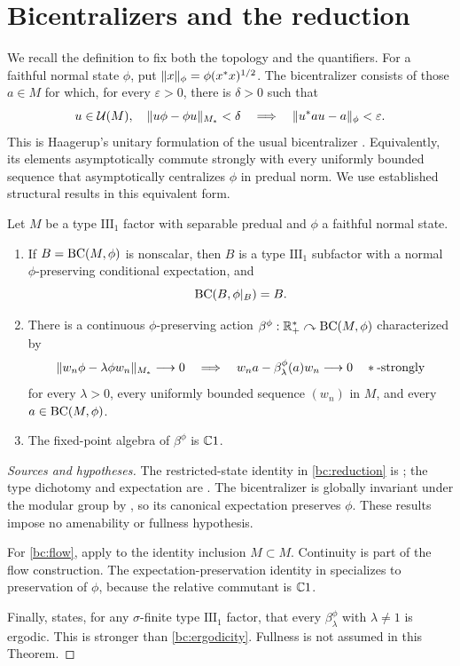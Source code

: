 \section{Bicentralizers and the reduction}\label{sec:bicentralizers}

We recall the definition to fix both the topology and the quantifiers.
For a faithful normal state $\phi$, put
$\lVert x\rVert_\phi=\phi(x^*x)^{1/2}$.
The bicentralizer consists of those $a\in M$ for which, for every
$\varepsilon>0$, there is $\delta>0$ such that
\[
  u\in\mathcal U(M),\quad
  \lVert u\phi-\phi u\rVert_{M_*}<\delta
  \quad\Longrightarrow\quad
  \lVert u^*au-a\rVert_\phi<\varepsilon.
\]
This is Haagerup's unitary formulation of the usual bicentralizer
\cite[proof of Lemma~1.2]{Haagerup1987}.
Equivalently, its elements asymptotically commute strongly with every
uniformly bounded sequence that asymptotically centralizes $\phi$ in
predual norm. We use established structural results in this equivalent
form.

\begin{proposition}\label{bc:inputs}
Let $M$ be a type $\mathrm{III}_1$ factor with separable predual and
$\phi$ a faithful normal state.
\begin{enumerate}
\item\label{bc:reduction}
If $B=\operatorname{BC}(M,\phi)$ is nonscalar, then $B$ is a type
$\mathrm{III}_1$ subfactor with a normal $\phi$-preserving conditional
expectation, and
\[
  \operatorname{BC}(B,\phi|_B)=B.
\]
\item\label{bc:flow}
There is a continuous $\phi$-preserving action
$\beta^\phi:\mathbb R_+^*\curvearrowright\operatorname{BC}(M,\phi)$ characterized by
\[
  \lVert w_n\phi-\lambda\phi w_n\rVert_{M_*}\longrightarrow0
  \quad\Longrightarrow\quad
  w_na-\beta^\phi_\lambda(a)w_n\longrightarrow0
  \quad *\text{-strongly}
\]
for every $\lambda>0$, every uniformly bounded sequence $(w_n)$ in $M$,
and every $a\in\operatorname{BC}(M,\phi)$.
\item\label{bc:ergodicity}
The fixed-point algebra of $\beta^\phi$ is $\mathbb C1$.
\end{enumerate}
\end{proposition}

\begin{proof}[Sources and hypotheses]
The restricted-state identity in \ref{bc:reduction} is
\cite[Proposition~3.4]{HI2017}; the type dichotomy and expectation are
\cite[Theorem~3.5]{HI2017}. The bicentralizer is globally invariant under
the modular group by \cite[Proposition~3.3]{HI2017}, so its canonical
expectation preserves $\phi$.
These results impose no amenability or fullness hypothesis.

For \ref{bc:flow}, apply \cite[Theorem~A(ii)]{AHHM2020} to the identity
inclusion $M\subset M$. Continuity is part of the flow construction.
The expectation-preservation identity in
\cite[Theorem~A(iv)]{AHHM2020} specializes to preservation of $\phi$,
because the relative commutant is $\mathbb C1$.

Finally, \cite[Theorem~D]{Marrakchi2020} states, for any $\sigma$-finite type
$\mathrm{III}_1$ factor, that every $\beta^\phi_\lambda$ with
$\lambda\ne1$ is ergodic. This is stronger than \ref{bc:ergodicity}.
Fullness is not assumed in this Theorem.
\end{proof}

